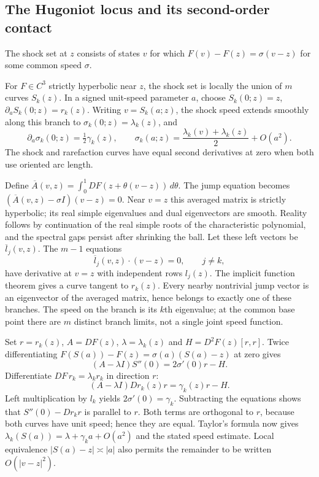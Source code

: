 \subsection{The Hugoniot locus and its second-order contact}
The shock set at $z$ consists of states $v$ for which
$F(v)-F(z)=\sigma(v-z)$ for some common speed $\sigma$.
\begin{theorem}
For $F\in C^3$ strictly hyperbolic near $z$, the shock set is locally
the union of $m$ curves $S_k(z)$. In a signed unit-speed parameter
$a$, choose $S_k(0;z)=z$, $\partial_aS_k(0;z)=r_k(z)$.
Writing $v=S_k(a;z)$, the shock speed extends smoothly along this
branch to $\sigma_k(0;z)=\lambda_k(z)$, and
\begin{equation}\label{eq:11-shock-expansion}
 \partial_a\sigma_k(0;z)=\tfrac12\gamma_k(z),\qquad
 \sigma_k(a;z)=\frac{\lambda_k(v)+\lambda_k(z)}2+O(a^2).
\end{equation}
The shock and rarefaction curves have equal second derivatives at zero
when both use oriented arc length.
\end{theorem}
\begin{expandedproof}
Define $\overline A(v,z)=\int_0^1DF(z+\theta(v-z))\,d\theta$.
The jump equation becomes
$(\overline A(v,z)-\sigma I)(v-z)=0$.
Near $v=z$ this averaged matrix is strictly hyperbolic; its real
simple eigenvalues and dual eigenvectors are smooth. Reality follows
by continuation of the real simple roots of the characteristic
polynomial, and the spectral gaps persist after shrinking the ball.
Let these left vectors be $\overline l_j(v,z)$. The $m-1$ equations
\[
 \overline l_j(v,z)\cdot(v-z)=0,\qquad j\ne k,
\]
 have derivative at $v=z$ with independent rows $l_j(z)$.
The implicit function theorem gives a curve tangent to $r_k(z)$.
Every nearby nontrivial jump vector is an eigenvector of the averaged
matrix, hence belongs to exactly one of these branches. The speed
on the branch is its $k$th eigenvalue; at the common base point there
are $m$ distinct branch limits, not a single joint speed function.

Set $r=r_k(z)$, $A=DF(z)$, $\lambda=\lambda_k(z)$ and
$H=D^2F(z)[r,r]$. Twice differentiating
$F(S(a))-F(z)=\sigma(a)(S(a)-z)$ at zero gives
\[
 (A-\lambda I)S''(0)=2\sigma'(0)r-H.
\]
Differentiate $DF\,r_k=\lambda_k r_k$ in direction $r$:
\[
 (A-\lambda I)Dr_k(z)r=\gamma_k(z)r-H.
\]
Left multiplication by $l_k$ yields $2\sigma'(0)=\gamma_k$.
Subtracting the equations shows that $S''(0)-Dr_k r$ is parallel
to $r$. Both terms are orthogonal to $r$, because both curves have
unit speed; hence they are equal. Taylor's formula now gives
$\lambda_k(S(a))=\lambda+\gamma_k a+O(a^2)$ and the stated speed
estimate. Local equivalence $|S(a)-z|\asymp|a|$ also permits the
remainder to be written $O(|v-z|^2)$.
\end{expandedproof}

